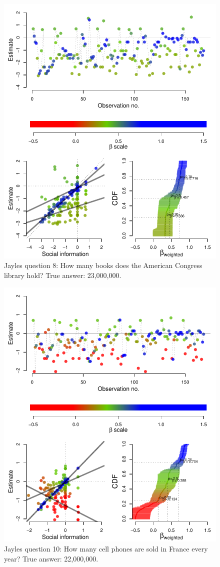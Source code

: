 \documentclass[9pt,twoside,lineno]{pnas-new}
\begin{document}
\begin{figure}[htbp]
	\centering\includegraphics[width=.5\textwidth]{../plots/jayles8.pdf}
	\caption{Jayles question 8: How many books does the American Congress library hold? True answer: 23,000,000.}\label{fig: Jayles question 8}
\end{figure}


\begin{figure}[htbp]
	\centering\includegraphics[width=.5\textwidth]{../plots/jayles10.pdf}
	\caption{Jayles question 10: How many cell phones are sold in France every year? True answer: 22,000,000.}\label{fig: Jayles question 10}
\end{figure}
\end{document}
